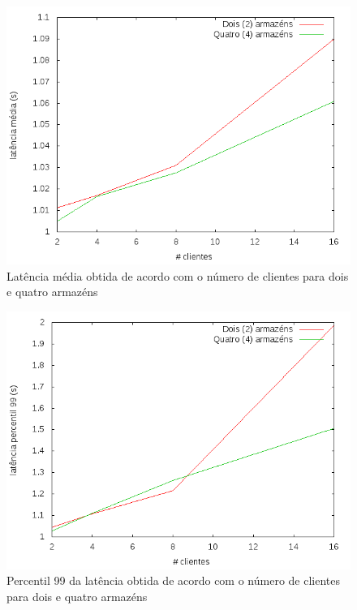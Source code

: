 \newpage

\begin{figure}[!h]
\centering
\includegraphics[scale=.4]{img/questao-1/read-com-lat-med}
\caption{Latência média obtida de acordo com o número de clientes para dois e quatro armazéns}
\end{figure}


\begin{figure}[!h]
\centering
\includegraphics[scale=.4]{img/questao-1/read-com-lat-pct99}
\caption{Percentil 99 da latência obtida de acordo com o número de clientes para dois e quatro armazéns}
\end{figure}


